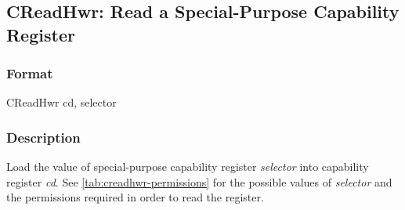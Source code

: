 \clearpage
{}
{}
\subsection*{CReadHwr: Read a Special-Purpose Capability Register}

\subsubsection*{Format}

CReadHwr cd, selector

\begin{center}
\end{center}

\subsubsection*{Description}

Load the value of special-purpose capability register \emph{selector}
into capability register \emph{cd}.
See \autoref{tab:creadhwr-permissions} for the possible values of
\emph{selector} and the permissions required in order to read the register.

\newcommand{\KernelAndAccessSysRegs}{
\begin{tabular}[c]{@{}l@{}}Supervisor Mode and\\
\PCC{}.\cperms{}.\emph{Access\_System\_Registers}
\end{tabular}
}

